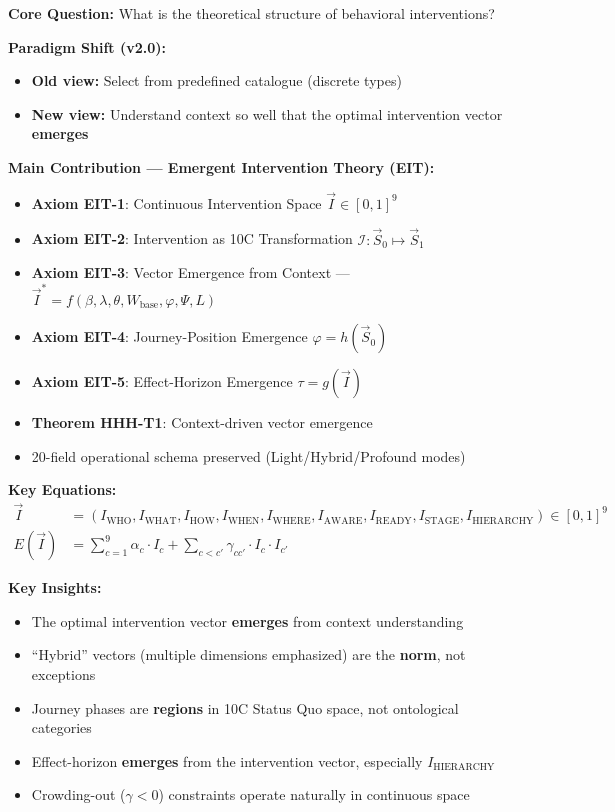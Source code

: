 \begin{tcolorbox}[colback=green!10!white, colframe=green!75!black,
    title=\textbf{Appendix TKT: Summary (v2.0 --- Emergent Intervention Theory)}]

\textbf{Core Question:} What is the theoretical structure of behavioral interventions?

\textbf{Paradigm Shift (v2.0):}
\begin{itemize}[nosep]
    \item \textbf{Old view:} Select from predefined catalogue (discrete types)
    \item \textbf{New view:} Understand context so well that the optimal intervention vector \textbf{emerges}
\end{itemize}

\textbf{Main Contribution --- Emergent Intervention Theory (EIT):}
\begin{itemize}[nosep]
    \item \textbf{Axiom EIT-1}: Continuous Intervention Space $\vec{I} \in [0,1]^9$
    \item \textbf{Axiom EIT-2}: Intervention as 10C Transformation $\mathcal{I}: \vec{S}_0 \mapsto \vec{S}_1$
    \item \textbf{Axiom EIT-3}: Vector Emergence from Context --- $\vec{I}^* = f(\beta, \lambda, \theta, W_{\text{base}}, \varphi, \Psi, L)$
    \item \textbf{Axiom EIT-4}: Journey-Position Emergence $\varphi = h(\vec{S}_0)$
    \item \textbf{Axiom EIT-5}: Effect-Horizon Emergence $\tau = g(\vec{I})$
    \item \textbf{Theorem HHH-T1}: Context-driven vector emergence
    \item 20-field operational schema preserved (Light/Hybrid/Profound modes)
\end{itemize}

\textbf{Key Equations:}
\begin{align*}
\vec{I} &= (I_{\text{WHO}}, I_{\text{WHAT}}, I_{\text{HOW}}, I_{\text{WHEN}}, I_{\text{WHERE}}, I_{\text{AWARE}}, I_{\text{READY}}, I_{\text{STAGE}}, I_{\text{HIERARCHY}}) \in [0,1]^9 \\
E(\vec{I}) &= \sum_{c=1}^{9} \alpha_c \cdot I_c + \sum_{c < c'} \gamma_{cc'} \cdot I_c \cdot I_{c'}
\end{align*}

\textbf{Key Insights:}
\begin{itemize}[nosep]
    \item The optimal intervention vector \textbf{emerges} from context understanding
    \item ``Hybrid'' vectors (multiple dimensions emphasized) are the \textbf{norm}, not exceptions
    \item Journey phases are \textbf{regions} in 10C Status Quo space, not ontological categories
    \item Effect-horizon \textbf{emerges} from the intervention vector, especially $I_{\text{HIERARCHY}}$
    \item Crowding-out ($\gamma < 0$) constraints operate naturally in continuous space
\end{itemize}


\end{tcolorbox}
